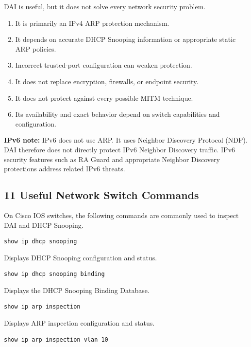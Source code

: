 DAI is useful, but it does not solve every network security problem.

\begin{enumerate}
\item It is primarily an IPv4 ARP protection mechanism.
\item It depends on accurate DHCP Snooping information or appropriate static ARP policies.
\item Incorrect trusted-port configuration can weaken protection.
\item It does not replace encryption, firewalls, or endpoint security.
\item It does not protect against every possible MITM technique.
\item Its availability and exact behavior depend on switch capabilities and configuration.
\end{enumerate}

\textbf{IPv6 note:} IPv6 does not use ARP. It uses Neighbor Discovery Protocol (NDP). DAI therefore does not directly protect IPv6 Neighbor Discovery traffic. IPv6 security features such as RA Guard and appropriate Neighbor Discovery protections address related IPv6 threats.

\subsection{11 Useful Network Switch Commands}

On Cisco IOS switches, the following commands are commonly used to inspect DAI and DHCP Snooping.

\begin{lstlisting}
show ip dhcp snooping
\end{lstlisting}

Displays DHCP Snooping configuration and status.

\begin{lstlisting}
show ip dhcp snooping binding
\end{lstlisting}

Displays the DHCP Snooping Binding Database.

\begin{lstlisting}
show ip arp inspection
\end{lstlisting}

Displays ARP inspection configuration and status.

\begin{lstlisting}
show ip arp inspection vlan 10
\end{lstlisting}

